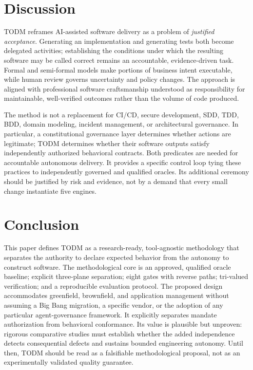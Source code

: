 \documentclass[11pt,a4paper]{article}
\newcommand{\todm}{\textsc{TODM}}
\begin{document}
\section{Discussion}
TODM reframes AI-assisted software delivery as a problem of \emph{justified acceptance}. Generating an implementation and generating tests both become delegated activities; establishing the conditions under which the resulting software may be called correct remains an accountable, evidence-driven task. Formal and semi-formal models make portions of business intent executable, while human review governs uncertainty and policy changes. The approach is aligned with professional software craftsmanship understood as responsibility for maintainable, well-verified outcomes rather than the volume of code produced.

The method is not a replacement for CI/CD, secure development, SDD, TDD, BDD, domain modeling, incident management, or architectural governance. In particular, a constitutional governance layer determines whether actions are legitimate; TODM determines whether their software outputs satisfy independently authorized behavioral contracts. Both predicates are needed for accountable autonomous delivery. It provides a specific control loop tying these practices to independently governed and qualified oracles. Its additional ceremony should be justified by risk and evidence, not by a demand that every small change instantiate five engines.

\section{Conclusion}
This paper defines \todm{} as a research-ready, tool-agnostic methodology that separates the authority to declare expected behavior from the autonomy to construct software. The methodological core is an approved, qualified oracle baseline; explicit three-plane separation; eight gates with reverse paths; tri-valued verification; and a reproducible evaluation protocol. The proposed design accommodates greenfield, brownfield, and application management without assuming a Big Bang migration, a specific vendor, or the adoption of any particular agent-governance framework. It explicitly separates mandate authorization from behavioral conformance. Its value is plausible but unproven: rigorous comparative studies must establish whether the added independence detects consequential defects and sustains bounded engineering autonomy. Until then, TODM should be read as a falsifiable methodological proposal, not as an experimentally validated quality guarantee.
\end{document}
